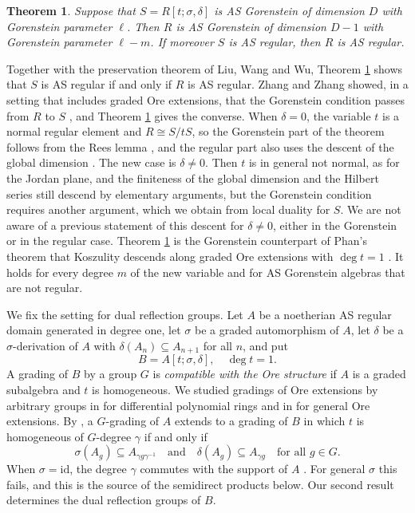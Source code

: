 \documentclass[reqno]{amsart}
\numberwithin{equation}{section}
\theoremstyle{definition}
\theoremstyle{remark}
\theoremstyle{plain}
\newtheorem{introtheorem}{Theorem}
\begin{document}
\begin{introtheorem}\label{YAMa7Qd2}
Suppose that $S=R[t;\sigma,\delta]$ is AS Gorenstein of dimension $D$ with Gorenstein parameter $\ell$. Then $R$ is AS Gorenstein of dimension $D-1$ with Gorenstein parameter $\ell-m$. If moreover $S$ is AS regular, then $R$ is AS regular.
\end{introtheorem}

Together with the preservation theorem of Liu, Wang and Wu, Theorem \ref{YAMa7Qd2} shows that $S$ is AS regular if and only if $R$ is AS regular. Zhang and Zhang showed, in a setting that includes graded Ore extensions, that the Gorenstein condition passes from $R$ to $S$ \cite[Proposition 3.2]{ZZ}, and Theorem \ref{YAMa7Qd2} gives the converse. When $\delta=0$, the variable $t$ is a normal regular element and $R\cong S/tS$, so the Gorenstein part of the theorem follows from the Rees lemma \cite[Proposition 3.4(b)]{Lev}, and the regular part also uses the descent of the global dimension \cite[\S7.5]{MR}. The new case is $\delta\neq0$. Then $t$ is in general not normal, as for the Jordan plane, and the finiteness of the global dimension and the Hilbert series still descend by elementary arguments, but the Gorenstein condition requires another argument, which we obtain from local duality for $S$. We are not aware of a previous statement of this descent for $\delta\neq0$, either in the Gorenstein or in the regular case. Theorem \ref{YAMa7Qd2} is the Gorenstein counterpart of Phan's theorem that Koszulity descends along graded Ore extensions with $\deg t=1$ \cite[Corollary 1.3]{Pha}. It holds for every degree $m$ of the new variable and for AS Gorenstein algebras that are not regular.

We fix the setting for dual reflection groups. Let $A$ be a noetherian AS regular domain generated in degree one, let $\sigma$ be a graded automorphism of $A$, let $\delta$ be a $\sigma$-derivation of $A$ with $\delta(A_n)\subseteq A_{n+1}$ for all $n$, and put
\[
B=A[t;\sigma,\delta],\quad\deg t=1.
\]
A grading of $B$ by a group $G$ is \emph{compatible with the Ore structure} if $A$ is a graded subalgebra and $t$ is homogeneous. We studied gradings of Ore extensions by arbitrary groups in \cite{AM1} for differential polynomial rings and in \cite{AM2} for general Ore extensions. By \cite[Theorem A]{AM2}, a $G$-grading of $A$ extends to a grading of $B$ in which $t$ is homogeneous of $G$-degree $\gamma$ if and only if
\[
\sigma(A_g)\subseteq A_{\gamma g\gamma^{-1}}\quad\text{and}\quad\delta(A_g)\subseteq A_{\gamma g}\quad\text{for all }g\in G.
\]
When $\sigma=\mathrm{id}$, the degree $\gamma$ commutes with the support of $A$ \cite[Remark 2.2(2)]{AM2}. For general $\sigma$ this fails, and this is the source of the semidirect products below. Our second result determines the dual reflection groups of $B$.
\end{document}
